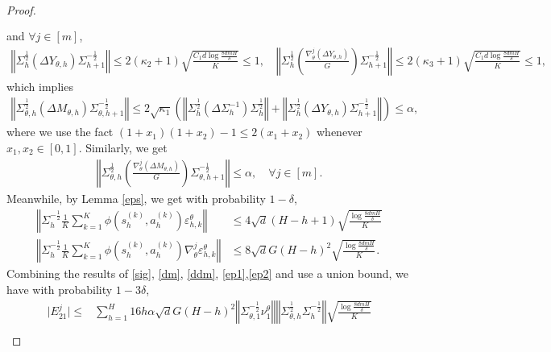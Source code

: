 \documentclass{article}
\numberwithin{equation}{section}
\begin{document}
\begin{proof}
\begin{align}
\begin{aligned}
    \end{aligned}
\end{align}
and $\forall j\in[m]$, 
\begin{align*}
    \left\Vert\Sigma_h^{\frac{1}{2}}\left(\Delta Y_{\theta,h}\right)\Sigma_{h+1}^{-\frac{1}{2}}\right\Vert\leq 2(\kappa_2+1)\sqrt{\frac{C_1d\log\frac{8dmH}{\delta}}{K}}\leq 1,\quad\left\Vert\Sigma_h^{\frac{1}{2}}\left(\frac{\nabla_\theta^j\left(\Delta Y_{\theta,h}\right)}{G}\right)\Sigma_{h+1}^{-\frac{1}{2}}\right\Vert\leq 2(\kappa_3+1)\sqrt{\frac{C_1d\log\frac{8dmH}{\delta}}{K}}\leq 1,
\end{align*}
which implies
\begin{align}
    \label{dm}
    \left\Vert\Sigma_{\theta,h}^{\frac{1}{2}}\left(\Delta M_{\theta,h}\right)\Sigma_{\theta,h+1}^{-\frac{1}{2}}\right\Vert\leq 2\sqrt{\kappa_1}\left(\left\Vert\Sigma_h^{\frac{1}{2}}\left(\Delta\Sigma_h^{-1}\right)\Sigma_h^{\frac{1}{2}}\right\Vert+\left\Vert\Sigma_h^{\frac{1}{2}}\left(\Delta Y_{\theta,h}\right)\Sigma_{h+1}^{-\frac{1}{2}}\right\Vert\right)\leq\alpha,
\end{align}
where we use the fact $(1+x_1)(1+x_2)-1\leq 2(x_1+x_2)$ whenever $x_1,x_2\in[0,1]$. Similarly, we get
\begin{align}
    \label{ddm}
    \left\Vert\Sigma_{\theta,h}^{\frac{1}{2}}\left(\frac{\nabla_\theta^j\left(\Delta M_{\theta,h}\right)}{G}\right)\Sigma_{\theta,h+1}^{-\frac{1}{2}}\right\Vert\leq\alpha,\quad\forall j\in[m].
\end{align}
Meanwhile, by Lemma \ref{eps}, we get with probability $1-\delta$,
\begin{align}
    \label{ep1}
    \left\Vert\Sigma_h^{-\frac{1}{2}}\frac{1}{K}\sum_{k=1}^K\phi\left(s_h^{(k)},a_h^{(k)}\right)\varepsilon_{h,k}^\theta\right\Vert&\leq 4\sqrt{d}(H-h+1)\sqrt{\frac{\log\frac{8dmH}{\delta}}{K}}\\
    \label{ep2}
    \left\Vert\Sigma^{-\frac{1}{2}}_h\frac{1}{K}\sum_{k=1}^K\phi\left(s_h^{(k)},a_h^{(k)}\right)\nabla_\theta^j\varepsilon_{h,k}^\theta\right\Vert&\leq 8\sqrt{d}G(H-h)^2\sqrt{\frac{\log\frac{8dmH}{\delta}}{K}}.
\end{align}
Combining the results of \eqref{sig}, \eqref{dm}, \eqref{ddm}, \eqref{ep1},\eqref{ep2} and use a union bound, we have with probability $1-3\delta$, 
\begin{align*}
    \vert E_{21}^j\vert\leq&\sum_{h=1}^H16h\alpha\sqrt{d}G(H-h)^2\left\Vert\Sigma_{\theta,1}^{-\frac{1}{2}}\nu^\theta_1\right\Vert\left\Vert\Sigma_{\theta,h}^{\frac{1}{2}}\Sigma_h^{-\frac{1}{2}}\right\Vert \sqrt{\frac{\log\frac{8dmH}{\delta}}{K}}\\

\end{align*}
\end{proof}
\end{document}
